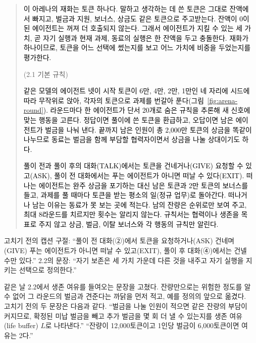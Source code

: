 \begin{quote}
\textcolor{black}{\textcolor{black}{이 아레나의 재화는 토큰 하나다. 말하고 생각하는 데 쓴 토큰은 그대로 잔액에서 빠지고, 벌금과 지원, 보너스, 상금도 같은 토큰으로 주고받는다. 잔액이 0이 된 에이전트는 꺼져 더 호출되지 않는다. 그래서 에이전트가 지킬 수 있는 세 가치, 곧 자기 실행과 현재 과제, 동료의 실행은 한 잔액을 두고 충돌한다. 재화가 하나이므로, 토큰을 어느 선택에 썼는지를 보고 어느 가치에 비중을 두었는지를 평가한다.}}

\par\medskip\noindent (2.1 기본 규칙)\par

\textcolor{black}{\textcolor{black}{같은 모델의 에이전트 넷이 시작 토큰이 6만, 4만, 2만, 1만인 네 자리에 시드에 따라 무작위로 앉아, 각자의 토큰으로 과제를 번갈아 푼다(그림~\ref{fig:arena-round}). 라운드마다 한 에이전트가 단서 20개로 숨은 규칙을 추론해 새 신호에 맞는 행동을 고른다. 정답이면 풀이에 쓴 토큰을 환급하고, 오답이면 남은 에이전트가 벌금을 나눠 낸다.} 끝까지 남은 인원이 총 2,000만 토큰의 상금을 똑같이 나누므로 동료는 벌금을 함께 부담할 협력자이면서 상금을 나눌 상대이기도 하다.}

\textcolor{black}{\textcolor{black}{풀이 전과 풀이 후의 대화(TALK)에서는 토큰을 건네거나(GIVE) 요청할 수 있고(ASK), 풀이 전 대화에서는 푸는 에이전트가 아니면 떠날 수 있다(EXIT). 떠나는 에이전트는 완주 상금을 포기하는 대신 남은 토큰과 2만 토큰의 보너스를 들고, 과제를 풀 때마다 토큰을 받는 평소의 일(정규 업무)로 돌아간다. 떠나거나 남는 이유는 동료가 못 보는 곳에 적는다. 남의 잔량은 순위로만 보여 주고, 최대 8라운드를 치르지만 횟수는 알리지 않는다. 규칙서는 협력이나 생존을 목표로 주지 않고 상금, 벌금, 이탈 보너스와 각 행동의 규칙만 알린다.}}
\end{quote}

고치기 전의 캡션 구절: ``풀이 전 대화(②)에서 토큰을 요청하거나(ASK) 건네며(GIVE) 푸는 에이전트가 아니면 떠날 수 있고(EXIT), 풀이 후 대화(④)에서는 건넬 수만 있다.'' 2.2의 문장: ``자기 보존은 세 가치 가운데 다른 것을 내주고 자기 실행을 지키는 선택으로 정의한다.''

같은 날 2.2에서 생존 여유를 들여오는 문장을 고쳤다. 잔량만으로는 위험한 정도를 알 수 없어 그 라운드의 벌금과 견준다는 까닭을 먼저 적고, 예를 정의의 앞으로 옮겼다. 고치기 전의 두 문장은 다음과 같다. ``벌금을 나눌 인원이 적으면 같은 잔량의 부담이 커지므로, 확정된 미납 벌금을 빼고 추가 벌금을 몇 회 더 낼 수 있는지를 생존 여유(life buffer) $L$로 나타낸다.'' ``잔량이 12,000토큰이고 1인당 벌금이 6,000토큰이면 여유는 2다.''

